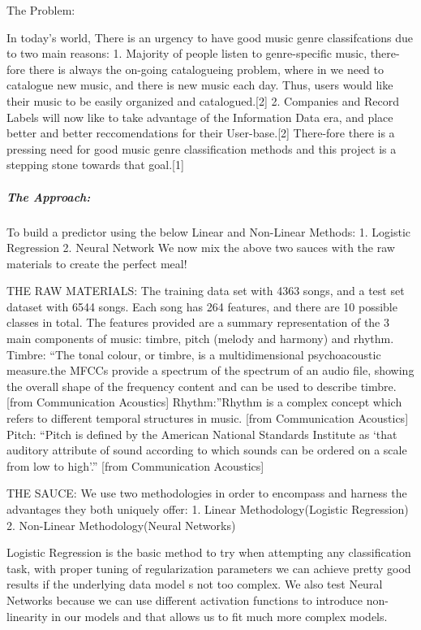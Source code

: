 \documentclass[11pt]{article}
\begin{document}
The Problem:

In today's world, There is an urgency to have good music genre
classifcations due to two main reasons: 1. Majority of people listen to
genre-specific music, there-fore there is always the on-going
catalogueing problem, where in we need to catalogue new music, and there
is new music each day. Thus, users would like their music to be easily
organized and catalogued.{[}2{]} 2. Companies and Record Labels will now
like to take advantage of the Information Data era, and place better and
better reccomendations for their User-base.{[}2{]} There-fore there is a
pressing need for good music genre classification methods and this
project is a stepping stone towards that goal.{[}1{]}

\hypertarget{the-approach}{%
\subparagraph{The Approach:}\label{the-approach}}

To build a predictor using the below Linear and Non-Linear Methods: 1.
Logistic Regression 2. Neural Network We now mix the above two sauces
with the raw materials to create the perfect meal!

THE RAW MATERIALS: The training data set with 4363 songs, and a test set
dataset with 6544 songs. Each song has 264 features, and there are 10
possible classes in total. The features provided are a summary
representation of the 3 main components of music: timbre, pitch (melody
and harmony) and rhythm. Timbre: ``The tonal colour, or timbre, is a
multidimensional psychoacoustic measure.the MFCCs provide a spectrum of
the spectrum of an audio file, showing the overall shape of the
frequency content and can be used to describe timbre. {[}from
Communication Acoustics{]} Rhythm:''Rhythm is a complex concept which
refers to different temporal structures in music. {[}from Communication
Acoustics{]} Pitch: ``Pitch is defined by the American National
Standards Institute as `that auditory attribute of sound according to
which sounds can be ordered on a scale from low to high'.'' {[}from
Communication Acoustics{]}

THE SAUCE: We use two methodologies in order to encompass and harness
the advantages they both uniquely offer: 1. Linear Methodology(Logistic
Regression) 2. Non-Linear Methodology(Neural Networks)

Logistic Regression is the basic method to try when attempting any
classification task, with proper tuning of regularization parameters we
can achieve pretty good results if the underlying data model s not too
complex. We also test Neural Networks because we can use different
activation functions to introduce non-linearity in our models and that
allows us to fit much more complex models.
\end{document}
